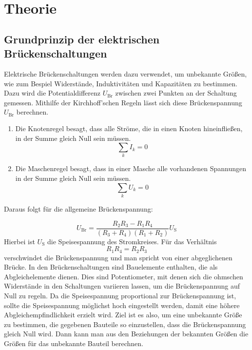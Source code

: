 \section{Theorie} \label{sec:Theorie}

\subsection{Grundprinzip der elektrischen Brückenschaltungen}

   Elektrische Brückenschaltungen werden dazu verwendet, um unbekannte Größen, wie zum Bespiel Widerstände, Induktivitäten und
   Kapazitäten zu bestimmen.
   Dazu wird die Potentialdifferenz $U_\text{Br}$ zwischen zwei Punkten an der Schaltung gemessen.
   Mithilfe der Kirchhoff'schen Regeln lässt sich diese Brückenspannung $U_\text{Br}$ berechnen.
   \begin{enumerate}
       \item Die Knotenregel besagt, dass alle Ströme, die in einen Knoten hineinfließen, in der Summe gleich Null sein müssen.
       \begin{equation}
           \sum_k I_k = 0
       \end{equation}
       \item Die Maschenregel besagt, dass in einer Masche alle vorhandenen Spannungen in der Summe gleich Null sein müssen.
       \begin{equation}
           \sum_k U_k = 0
       \end{equation}
   \end{enumerate}


   Daraus folgt für die allgemeine Brückenspannung:

   \begin{equation}
       U_\text{Br} = \frac{R_2R_3 - R_1R_4}{(R_3 + R_4)(R_1 + R_2)} U_\text{S}
   \end{equation}
   Hierbei ist $U_\text{S}$ die Speisespannung des Stromkreises.
   Für das Verhältnis
   \begin{equation}
       R_1R_4 = R_2R_3 \label{eqn:Widerstände}
   \end{equation}
   verschwindet die Brückenspannung und man spricht von einer abgeglichenen Brücke.
   In den Brückenschaltungen sind Bauelemente enthalten, die als Abgleichelemente dienen.
   Dies sind Potentiometer, mit denen sich die ohmschen Widerstände in den Schaltungen variieren lassen, um
   die Brückenspannung auf Null zu regeln.
   Da die Speisespannung proportional zur Brückenspannung ist, sollte die Speisespannung möglichst hoch eingestellt werden,
   damit eine höhere Abgleichempfindlichkeit erzielt wird.
   Ziel ist es also, um eine unbekannte Größe zu bestimmen, die gegebenen Bauteile so einzustellen, dass
   die Brückenspannung gleich Null wird. Dann kann man aus den Beziehungen der bekannten Größen die Größen für das unbekannte Bauteil berechnen.

